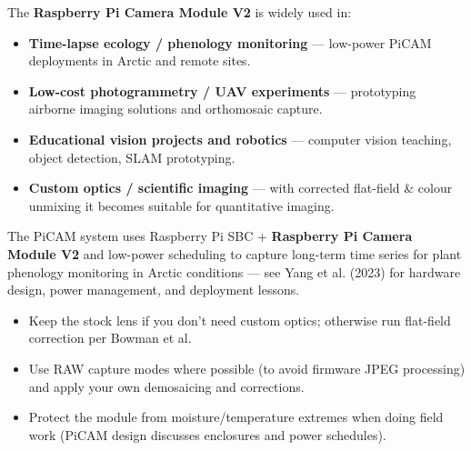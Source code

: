 {
	The \textbf{Raspberry Pi Camera Module V2} is widely used in:
	\begin{itemize}
	\item \textbf{Time-lapse ecology / phenology monitoring} — low-power PiCAM deployments in Arctic and remote sites. \cite{Yang:2023}
	\item \textbf{Low-cost photogrammetry / UAV experiments} — prototyping airborne imaging solutions and orthomosaic capture.
	\item \textbf{Educational vision projects and robotics} — computer vision teaching, object detection, SLAM prototyping.
	\item \textbf{Custom optics / scientific imaging} — with corrected flat-field \& colour unmixing it becomes suitable for quantitative imaging. \cite{Pagnutti:2017, Bowman:2020}
	\end{itemize}
}

{
The PiCAM system uses Raspberry Pi SBC + \textbf{Raspberry Pi Camera Module V2} and low-power scheduling to capture long-term time series for plant phenology monitoring in Arctic conditions — see Yang et al. (2023) for hardware design, power management, and deployment lessons. \cite{Yang:2023}
}

{
	\begin{itemize}
	\item Keep the stock lens if you don't need custom optics; otherwise run flat-field correction per Bowman et al. \cite{Bowman:2020}
	\item Use RAW capture modes where possible (to avoid firmware JPEG processing) and apply your own demosaicing and corrections.
	\item Protect the module from moisture/temperature extremes when doing field work (PiCAM design discusses enclosures and power schedules). \cite{Yang:2023}
	\end{itemize}
}

